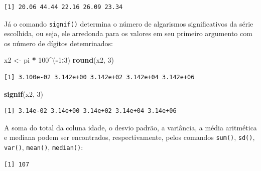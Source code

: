 \documentclass[12pt,brazil,oneside]{book}
\newenvironment{Shaded}{\begin{snugshade}}{\end{snugshade}}
\newcommand{\CommentTok}[1]{\textcolor[rgb]{0.56,0.35,0.01}{\textit{#1}}}
\newcommand{\DecValTok}[1]{\textcolor[rgb]{0.00,0.00,0.81}{#1}}
\newcommand{\KeywordTok}[1]{\textcolor[rgb]{0.13,0.29,0.53}{\textbf{#1}}}
\newcommand{\NormalTok}[1]{#1}
\newcommand{\OperatorTok}[1]{\textcolor[rgb]{0.81,0.36,0.00}{\textbf{#1}}}
\newcommand{\StringTok}[1]{\textcolor[rgb]{0.31,0.60,0.02}{#1}}
\begin{document}
\begin{verbatim}
[1] 20.06 44.44 22.16 26.09 23.34
\end{verbatim}

Já o comando \texttt{signif()} determina o número de algarismos significativos da série escolhida, ou seja, ele arredonda para os valores em seu primeiro argumento com os número de dígitos detemrinados:

\begin{Shaded}
\begin{Highlighting}[]
\NormalTok{x2 <-}\StringTok{ }\NormalTok{pi }\OperatorTok{*}\StringTok{ }\DecValTok{100}\OperatorTok{^}\NormalTok{(}\OperatorTok{-}\DecValTok{1}\OperatorTok{:}\DecValTok{3}\NormalTok{)}
\KeywordTok{round}\NormalTok{(x2, }\DecValTok{3}\NormalTok{)}
\end{Highlighting}
\end{Shaded}

\begin{verbatim}
[1] 3.100e-02 3.142e+00 3.142e+02 3.142e+04 3.142e+06
\end{verbatim}

\begin{Shaded}
\begin{Highlighting}[]
\KeywordTok{signif}\NormalTok{(x2, }\DecValTok{3}\NormalTok{) }
\end{Highlighting}
\end{Shaded}

\begin{verbatim}
[1] 3.14e-02 3.14e+00 3.14e+02 3.14e+04 3.14e+06
\end{verbatim}

A soma do total da coluna idade, o desvio padrão, a variância, a média aritmética e mediana podem ser encontrados, respectivamente, pelos comandos \texttt{sum()}, \texttt{sd()}, \texttt{var()}, \texttt{mean()}, \texttt{median()}:

\begin{Shaded}
\end{Shaded}

\begin{verbatim}
[1] 107
\end{verbatim}

\begin{Shaded}
\end{Shaded}
\end{document}
